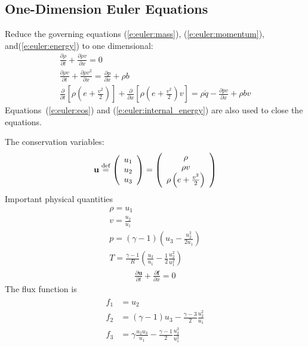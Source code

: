 \documentclass{turgon}
\begin{document}
\subsection{One-Dimension Euler Equations}

Reduce the governing equations (\ref{e:euler:mass}), (\ref{e:euler:momentum}),
and(\ref{e:euler:energy}) to one dimensional:
%
\begin{gather}
  \frac{\partial\rho}{\partial t} + \frac{\partial\rho v}{\partial x}
  = 0
  \label{e:euler1d:mass}
  \\
  \frac{\partial\rho v}{\partial t}
  + \frac{\partial\rho v^2}{\partial x}
  = \frac{\partial p}{\partial x} + \rho b
  \label{e:euler1d:momentum}
  \\
  \frac{\partial}{\partial t}
  \left[\rho\left( e + \frac{v^2}{2} \right)\right]
  + \frac{\partial}{\partial x}
  \left[\rho\left( e + \frac{v^2}{2} \right)v\right]
  = \rho \dot{q} - \frac{\partial pv}{\partial x} + \rho b v
  \label{e:euler1d:energy}
\end{gather}
%
Equations~(\ref{e:euler:eos}) and (\ref{e:euler:internal_energy}) are also used
to close the equations.

The conservation variables:
%
\begin{align}
  \mathbf{u} \defeq \left(
  \begin{array}{c}
    u_1 \\ u_2 \\ u_3
  \end{array}\right) = \left(
  \begin{array}{c}
    \rho \\ \rho v \\ \rho\left(e+\frac{v^2}{2}\right)
  \end{array}\right)
  \label{e:euler1d:unknown}
\end{align}
%
Important physical quantities
%
\begin{gather*}
  \rho = u_1 \\
  v = \frac{u_2}{u_1} \\
  p = (\gamma - 1)(u_3 - \frac{u_2^2}{2u_1}) \\
  T = \frac{\gamma - 1}{R}
  \left(
  \frac{u_3}{u_1} - \frac{1}{2} \frac{u_2^2}{u_1^2}
  \right)
\end{gather*}
%
\begin{gather}
  \frac{\partial\mathbf{u}}{\partial t} + \frac{\partial\mathbf{f}}{\partial x}
  = 0
  \label{e:euler1d:vec}
\end{gather}
%
The flux function is
%
\begin{align}
  \begin{aligned}
    f_1 &= u_2 \\
    f_2 &= (\gamma-1)u_3 - \frac{\gamma-3}{2}\frac{u_2^2}{u_1} \\
    f_3 &= \gamma\frac{u_2 u_3}{u_1}
    - \frac{\gamma-1}{2}\frac{u_2^3}{u_1^2}
  \end{aligned}
  \label{e:euler1d:flux}
\end{align}
\end{document}
